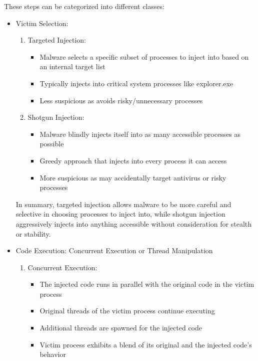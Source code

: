 \documentclass{article}
\begin{document}
These steps can be categorized into different classes:

\begin{itemize}
\item Victim Selection:
  \begin{enumerate}
    \item Targeted Injection:
      \begin{itemize}
      \item Malware selects a specific subset of processes to inject into based on an internal target list
      \item Typically injects into critical system processes like explorer.exe
      \item Less suspicious as avoids risky/unnecessary processes
      \end{itemize}
    \item Shotgun Injection:
      \begin{itemize}
        \item Malware blindly injects itself into as many accessible processes as possible
        \item Greedy approach that injects into every process it can access
        \item More suspicious as may accidentally target antivirus or risky processes
     \end{itemize}
 \end{enumerate}

  In summary, targeted injection allows malware to be more careful and selective in choosing processes to inject into, while shotgun injection aggressively injects into anything accessible without consideration for stealth or stability.

  \item Code Execution: Concurrent Execution or Thread Manipulation

    \begin{enumerate}
      \item Concurrent Execution:
        \begin{itemize}
          \item The injected code runs in parallel with the original code in the victim process
          \item Original threads of the victim process continue executing
          \item Additional threads are spawned for the injected code
          \item Victim process exhibits a blend of its original and the injected code's behavior
        \end{itemize}


\end{enumerate}
\end{itemize}
\end{document}
